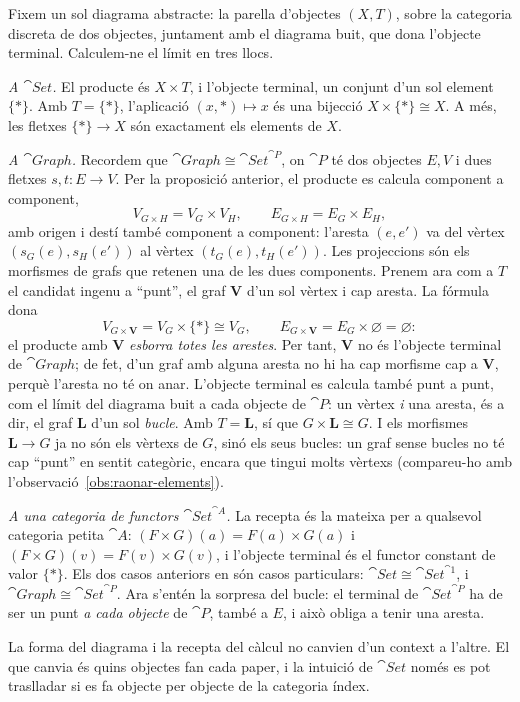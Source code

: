 \begin{exemple}\label{ex:producte-tres-contextos}
Fixem un sol diagrama abstracte: la parella d'objectes $(X,T)$, sobre la categoria discreta de dos objectes, juntament amb el diagrama buit, que dona l'objecte terminal. Calculem-ne el límit en tres llocs.

\emph{A $\cat{Set}$.} El producte és $X\times T$, i l'objecte terminal, un conjunt d'un sol element $\{\ast\}$. Amb $T=\{\ast\}$, l'aplicació $(x,\ast)\mapsto x$ és una bijecció $X\times\{\ast\}\cong X$. A més, les fletxes $\{\ast\}\to X$ són exactament els elements de $X$.

\emph{A $\cat{Graph}$.} Recordem que $\cat{Graph}\cong\cat{Set}^{\cat{P}}$, on $\cat{P}$ té dos objectes $E,V$ i dues fletxes $s,t\colon E\to V$. Per la proposició anterior, el producte es calcula component a component,
\[
V_{G\times H}=V_G\times V_H,
\qquad
E_{G\times H}=E_G\times E_H,
\]
amb origen i destí també component a component: l'aresta $(e,e')$ va del vèrtex $(s_G(e),s_H(e'))$ al vèrtex $(t_G(e),t_H(e'))$. Les projeccions són els morfismes de grafs que retenen una de les dues components. Prenem ara com a $T$ el candidat ingenu a \enquote{punt}, el graf $\mathbf V$ d'un sol vèrtex i cap aresta. La fórmula dona
\[
V_{G\times\mathbf V}=V_G\times\{\ast\}\cong V_G,
\qquad
E_{G\times\mathbf V}=E_G\times\varnothing=\varnothing:
\]
el producte amb $\mathbf V$ \emph{esborra totes les arestes}. Per tant, $\mathbf V$ no és l'objecte terminal de $\cat{Graph}$; de fet, d'un graf amb alguna aresta no hi ha cap morfisme cap a $\mathbf V$, perquè l'aresta no té on anar. L'objecte terminal es calcula també punt a punt, com el límit del diagrama buit a cada objecte de $\cat{P}$: un vèrtex \emph{i} una aresta, és a dir, el graf $\mathbf L$ d'un sol \emph{bucle}. Amb $T=\mathbf L$, sí que $G\times\mathbf L\cong G$. I els morfismes $\mathbf L\to G$ ja no són els vèrtexs de $G$, sinó els seus bucles: un graf sense bucles no té cap \enquote{punt} en sentit categòric, encara que tingui molts vèrtexs (compareu-ho amb l'observació~\ref{obs:raonar-elements}).

\emph{A una categoria de functors $\cat{Set}^{\cat{A}}$.} La recepta és la mateixa per a qualsevol categoria petita $\cat{A}$: $(F\times G)(a)=F(a)\times G(a)$ i $(F\times G)(v)=F(v)\times G(v)$, i l'objecte terminal és el functor constant de valor $\{\ast\}$. Els dos casos anteriors en són casos particulars: $\cat{Set}\cong\cat{Set}^{\cat{1}}$, i $\cat{Graph}\cong\cat{Set}^{\cat{P}}$. Ara s'entén la sorpresa del bucle: el terminal de $\cat{Set}^{\cat{P}}$ ha de ser un punt \emph{a cada objecte} de $\cat{P}$, també a $E$, i això obliga a tenir una aresta.

La forma del diagrama i la recepta del càlcul no canvien d'un context a l'altre. El que canvia és quins objectes fan cada paper, i la intuició de $\cat{Set}$ només es pot traslladar si es fa objecte per objecte de la categoria índex.
\end{exemple}

